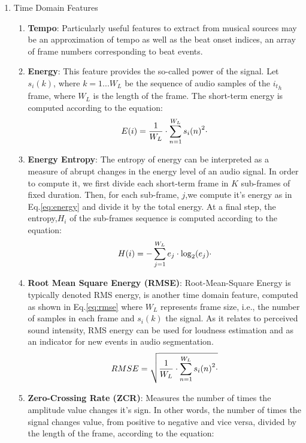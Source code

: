 \documentclass[conference]{IEEEtran}
\begin{document}
\begin{enumerate}
    \item Time Domain Features
    \begin{enumerate}
        \item\textbf{Tempo}: Particularly useful features to extract from musical sources may be an approximation of tempo as well as the beat onset indices, an array of frame numbers corresponding to beat events.
        \item\textbf{Energy}: This feature provides the so-called power of the signal. Let ${s_i(k)}$, where $k=1...W_L$ be the sequence of audio samples of the ${i_t}_h$ frame, where $W_L$ is the length of the frame. The short-term energy is computed according to the equation:
        \begin{equation}\label{eq:energy}\small
            E(i)=\frac{1}{W_L}\cdot\sum_{n=1}^{W_L} {s_i(n)}^2\cdot
        \end{equation}
        \item\textbf{Energy Entropy}: The entropy of energy can be interpreted as a measure of abrupt changes in the energy level of an audio signal. In order to compute it, we first divide each short-term frame in $K$ sub-frames of fixed duration. Then, for each sub-frame, $j$,we compute it's energy as in Eq.\ref{eq:energy} and divide it by the total energy. At a final step, the entropy,${H_i}$ of the sub-frames sequence is computed according to the equation:
        \begin{equation}\label{eq:entropy_energy}\small
            H(i)=-\sum_{j=1}^{W_L} e_j\cdot\log_{2}(e_j)\cdot     
        \end{equation}
        \item\textbf{Root Mean Square Energy (RMSE)}:
        Root-Mean-Square Energy is typically denoted RMS energy, is another time domain feature, computed as shown in Eq.\ref{eq:rmse} where $W_L$ represents frame size, i.e., the number of samples in each frame and ${s_i(k)}$ the signal. As it relates to perceived sound intensity, RMS energy can be used for loudness estimation and as an indicator for new events in audio segmentation. \cite{rmse}
        \begin{equation}\label{eq:rmse}\small
            RMSE=\sqrt{\frac{1}{W_L}\cdot\sum_{n=1}^{W_L} {s_i(n)}^2\cdot}
        \end{equation}
        \item\textbf{Zero-Crossing Rate (ZCR)}: Measures the number of times the amplitude value changes it's sign. In other words, the number of times the signal changes value, from positive to negative and vice versa, divided by the length of the frame, according to the equation:

\end{enumerate}
\end{enumerate}
\end{document}
